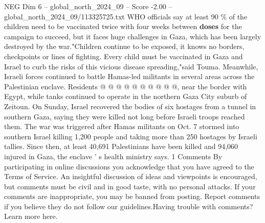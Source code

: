 \begin{textsample}{NEG Dim 6 – global\_north\_2024\_09 – Score -2.00 – global\_north\_2024\_09/113325725.txt}
WHO officials say at least 90 \% of the children need to be vaccinated twice with four weeks between \textbf{doses} for the campaign to succeed, but it faces huge challenges in Gaza, which has been largely destroyed by the war."Children continue to be exposed, it knows no borders, checkpoints or lines of fighting.
Every child must be vaccinated in Gaza and Israel to curb the risks of this vicious disease spreading,"said Touma.
Meanwhile, Israeli forces continued to battle Hamas-led militants in several areas across the Palestinian enclave.
Residents @ @ @ @ @ @ @ @ @ @, near the border with Egypt, while tanks continued to operate in the northern Gaza City suburb of Zeitoun.
On Sunday, Israel recovered the bodies of six hostages from a tunnel in southern Gaza, saying they were killed not long before Israeli troops reached them.
The war was triggered after Hamas militants on Oct. 7 stormed into southern Israel killing 1,200 people and taking more than 250 hostages by Israeli tallies.
Since then, at least 40,691 Palestinians have been killed and 94,060 injured in Gaza, the enclave ' s health ministry says. 1 Comments By participating in online discussions you acknowledge that you have agreed to the Terms of Service.
An insightful discussion of ideas and viewpoints is encouraged, but comments must be civil and in good taste, with no personal attacks.
If your comments are inappropriate, you may be banned from posting.
Report comments if you believe they do not follow our guidelines.Having trouble with comments?
Learn more here.

\end{textsample}
